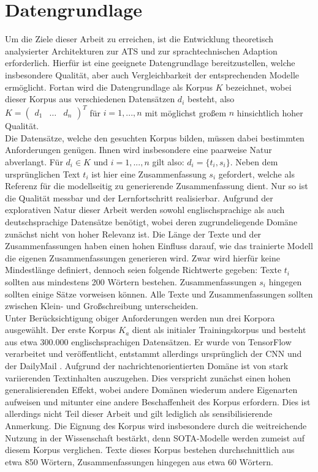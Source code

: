 \chapter{Datengrundlage}
\thispagestyle{fancy}
\label{chap:Datengrundlage}

\noindent
Um die Ziele dieser Arbeit zu erreichen, ist die Entwicklung theoretisch analysierter Architekturen zur \ac{ATS} und zur sprachtechnischen Adaption erforderlich. Hierfür ist eine geeignete Datengrundlage bereitzustellen, welche insbesondere Qualität, aber auch Vergleichbarkeit der entsprechenden Modelle ermöglicht. Fortan wird die Datengrundlage als Korpus $K$ bezeichnet, wobei dieser Korpus aus verschiedenen Datensätzen $d_i$ besteht, also $K=\begin{pmatrix} d_1 & \dots & d_n \end{pmatrix}^{T}$ für $i=1,...,n$ mit möglichst großem $n$ hinsichtlich hoher Qualität.\\

\noindent
Die Datensätze, welche den gesuchten Korpus bilden, müssen dabei bestimmten Anforderungen genügen. Ihnen wird insbesondere eine paarweise Natur abverlangt. Für $d_i \in K$ und $i=1,...,n$ gilt also: $d_i=\{t_i,s_i\}$. Neben dem ursprünglichen Text $t_i$ ist hier eine Zusammenfassung $s_i$ gefordert, welche als Referenz für die modellseitig zu generierende Zusammenfassung dient. Nur so ist die Qualität messbar und der Lernfortschritt realisierbar. Aufgrund der explorativen Natur dieser Arbeit werden sowohl englischsprachige als auch deutschsprachige Datensätze benötigt, wobei deren zugrundeliegende Domäne zunächst nicht von hoher Relevanz ist. Die Länge der Texte und der Zusammenfassungen haben einen hohen Einfluss darauf, wie das trainierte Modell die eigenen Zusammenfassungen generieren wird. Zwar wird hierfür keine Mindestlänge definiert, dennoch seien folgende Richtwerte gegeben: Texte $t_i$ sollten aus mindestens 200 Wörtern bestehen. Zusammenfassungen $s_i$ hingegen sollten einige Sätze vorweisen können. Alle Texte und Zusammenfassungen sollten zwischen Klein- und Großschreibung unterscheiden.\\

\noindent
Unter Berücksichtigung obiger Anforderungen werden nun drei Korpora ausgewählt. Der erste Korpus $K_a$ dient als initialer Trainingskorpus und besteht aus etwa 300.000 englischsprachigen Datensätzen. Er wurde von TensorFlow verarbeitet und veröffentlicht, entstammt allerdings ursprünglich der CNN und der DailyMail \cite{TEN21}. Aufgrund der nachrichtenorientierten Domäne ist von stark variierenden Textinhalten auszugehen. Dies verspricht zunächst einen hohen generalisierenden Effekt, wobei andere Domänen wiederum andere Eigenarten aufweisen und mitunter eine andere Beschaffenheit des Korpus erfordern. Dies ist allerdings nicht Teil dieser Arbeit und gilt lediglich als sensibilisierende Anmerkung. Die Eignung des Korpus wird insbesondere durch die weitreichende Nutzung in der Wissenschaft bestärkt, denn \ac{SOTA}-Modelle werden zumeist auf diesem Korpus verglichen. Texte dieses Korpus bestehen durchschnittlich aus etwa 850 Wörtern, Zusammenfassungen hingegen aus etwa 60 Wörtern.\\

